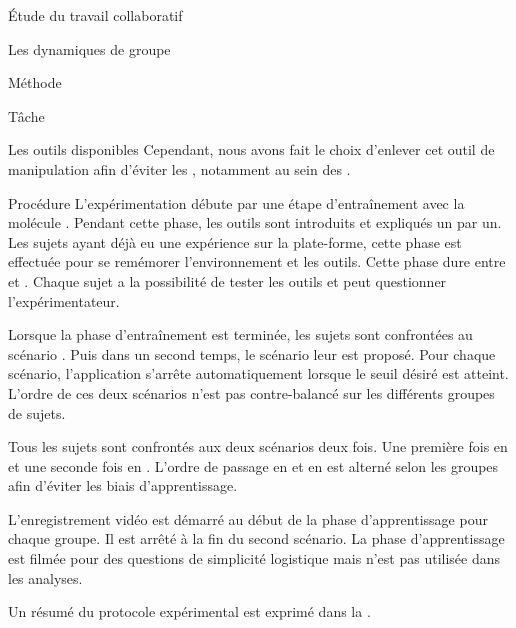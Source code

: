 \documentclass[myfrancais]{mythesis}
\begin{document}
\begin{mypart}{Étude du travail collaboratif}
\begin{mychapter}{Les dynamiques de groupe}
\begin{mysection}{Méthode}
\begin{mysubsection}{Tâche}
\begin{mysubsubsection}{Les outils disponibles}
						Cependant, nous avons fait le choix d'enlever cet outil de manipulation afin d'éviter les , notamment au sein des .
					\end{mysubsubsection}
				\end{mysubsection}
				\begin{mysubsection}{Procédure}
					L'expérimentation débute par une étape d'entraînement avec la molécule \myTRPCAGE.
					Pendant cette phase, les outils sont introduits et expliqués un par un.
					Les sujets ayant déjà eu une expérience sur la plate-forme, cette phase est effectuée pour se remémorer l'environnement et les outils.
					Cette phase dure entre  et .
					Chaque sujet a la possibilité de tester les outils et peut questionner l'expérimentateur.

					Lorsque la phase d'entraînement est terminée, les sujets sont confrontées au scénario .
					Puis dans un second temps, le scénario  leur est proposé.
					Pour chaque scénario, l'application s'arrête automatiquement lorsque le seuil  désiré est atteint.
					L'ordre de ces deux scénarios n'est pas contre-balancé sur les différents groupes de sujets.

					Tous les sujets sont confrontés aux deux scénarios deux fois.
					Une première fois en  et une seconde fois en .
					L'ordre de passage en  et en  est alterné selon les groupes afin d'éviter les biais d'apprentissage.

					L'enregistrement vidéo est démarré au début de la phase d'apprentissage pour chaque groupe.
					Il est arrêté à la fin du second scénario.
					La phase d'apprentissage est filmée pour des questions de simplicité logistique mais n'est pas utilisée dans les analyses.

					Un résumé du protocole expérimental est exprimé dans la .


\end{mysubsection}
\end{mysection}
\end{mychapter}
\end{mypart}
\end{document}

